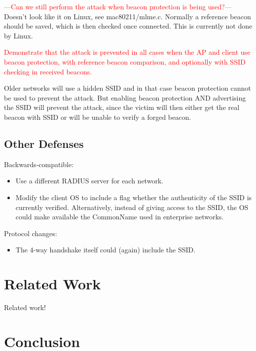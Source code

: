 \documentclass[sigconf,review]{acmart}
\DeclareRobustCommand{\red}[1]{\textcolor{red}{#1}}
\begin{document}
\red{---Can we still perform the attack when beacon protection is being used?---}
Doesn't look like it on Linux, see mac80211/mlme.c.
Normally a reference beacon should be saved, which is then checked once connected.
This is currently not done by Linux.

\red{Demonstrate that the attack is prevented in all cases when the AP and client use beacon protection, with reference beacon comparison, and optionally with SSID checking in received beacons.}

Older networks will use a hidden SSID and in that case beacon protection cannot be used to prevent the attack.
But enabling beacon protection AND advertising the SSID will prevent the attack, since the victim will then either get the real beacon with SSID or will be unable to verify a forged beacon.

\subsection{Other Defenses}

Backwards-compatible:
\begin{itemize}
	\item Use a different RADIUS server for each network.
	\item Modify the client OS to include a flag whether the authenticity of the SSID is currently verified.
	Alternatively, instead of giving access to the SSID, the OS could make available the CommonName used in enterprise networks.
\end{itemize}

Protocol changes:
\begin{itemize}
	\item The 4-way handshake itself could (again) include the SSID.
\end{itemize}


\section{Related Work}
\label{sec:relatedwork}

Related work!

\section{Conclusion}
\label{sec:conclusion}
\end{document}
